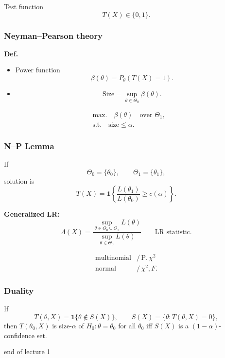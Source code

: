 \documentclass[11pt,a4paper]{article}
\begin{document}
\noindent
Test function
\[
T(X)\in\{0,1\}.
\]

\subsubsection*{Neyman--Pearson theory}

\noindent\textbf{Def.}
\begin{itemize}
    \item Power function
    \[
    \beta(\theta)=P_{\theta}(T(X)=1).
    \]

    \item
    \[
    \text{Size}
    =
    \sup_{\theta\in\Theta_0}\beta(\theta).
    \]
\end{itemize}

\[
\begin{aligned}
&\text{max.}\quad \beta(\theta)\quad\text{over }\Theta_1,\\
&\text{s.t.}\quad \text{size}\leq\alpha.
\end{aligned}
\]

\subsubsection*{N--P Lemma}

If
\[
\Theta_0=\{\theta_0\},
\qquad
\Theta_1=\{\theta_1\},
\]
solution is
\[
T(X)
=
\mathbf{1}\left\{
\boxed{\frac{L(\theta_1)}{L(\theta_0)}}
\geq c(\alpha)
\right\}.
\]

\medskip

\noindent\textbf{Generalized LR:}
\[
\Lambda(X)
=
\frac{
    \displaystyle\sup_{\theta\in\Theta_0\cup\Theta_1}L(\theta)
}{
    \displaystyle\sup_{\theta\in\Theta_0}L(\theta)
}
\qquad
\text{LR statistic}.
\]

\[
\begin{array}{ll}
\text{multinomial} & /\,\mathrm{P.}\,\chi^2\\
\text{normal} & /\,\chi^2,F.
\end{array}
\]

\subsubsection*{Duality}

If
\[
T(\theta,X)
=
\mathbf{1}\{\theta\notin S(X)\},
\qquad
S(X)=\{\theta:T(\theta,X)=0\},
\]
then $T(\theta_0,X)$ is size-$\alpha$ of
$H_0:\theta=\theta_0$ for all $\theta_0$
iff $S(X)$ is a $(1-\alpha)$-confidence set.

\begin{center}
end of lecture 1
\end{center}
\end{document}

